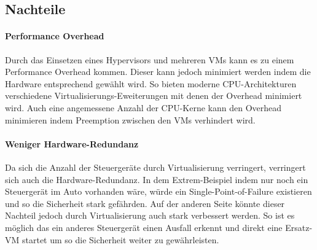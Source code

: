 \documentclass[
  a4paper,					    %
  twoside,
  DIV=calc,     				%
  bibliography=totoc,
  cleardoublepage=empty,
  ngerman,     					%
  final       					%
]{scrbook}
\begin{document}
\subsection{Nachteile}



\paragraph{Performance Overhead}
Durch das Einsetzen eines Hypervisors und mehreren VMs kann es zu einem Performance Overhead kommen. Dieser kann jedoch minimiert werden indem die Hardware entsprechend gewählt wird. So bieten moderne CPU-Architekturen verschiedene Virtualisierungs-Eweiterungen mit denen der Overhead minimiert wird. Auch eine angemessene Anzahl der CPU-Kerne kann den Overhead minimieren indem Preemption zwischen den VMs verhindert wird.

\paragraph{Weniger Hardware-Redundanz}
Da sich die Anzahl der Steuergeräte durch Virtualisierung verringert, verringert sich auch die Hardware-Redundanz. In dem Extrem-Beispiel indem nur noch ein Steuergerät im Auto vorhanden wäre, würde ein Single-Point-of-Failure existieren und so die Sicherheit stark gefährden. Auf der anderen Seite könnte dieser Nachteil jedoch durch Virtualisierung auch stark verbessert werden. So ist es möglich das ein anderes Steuergerät einen Ausfall erkennt und direkt eine Ersatz-VM startet um so die Sicherheit weiter zu gewährleisten. 






\end{document}
